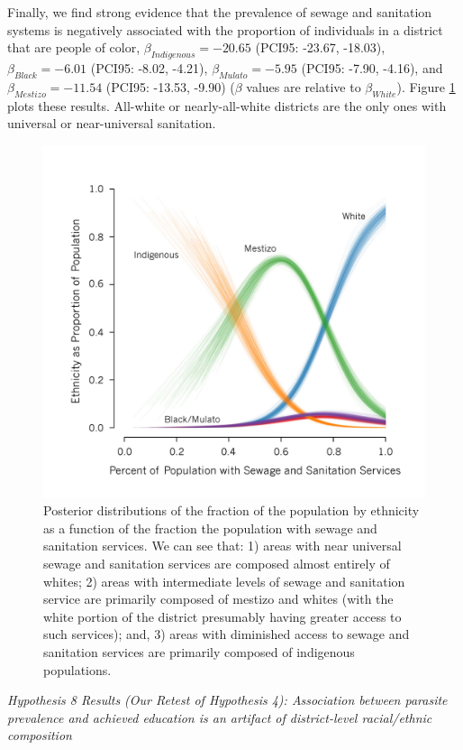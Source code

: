 \documentclass[12pt]{article}
\begin{document}
Finally, we find strong evidence that the prevalence of sewage and sanitation systems is negatively associated with the proportion of individuals in a district that are people of color, $\beta_{Indigenous}=-20.65$ (PCI95: -23.67, -18.03), $\beta_{Black}=-6.01$ (PCI95: -8.02, -4.21), $\beta_{Mulato}=-5.95$ (PCI95: -7.90, -4.16), and $\beta_{Mestizo}=-11.54
$ (PCI95: -13.53,  -9.90) ($\beta$ values are relative to $\beta_{White}$). Figure \ref{resSewerEth} plots these results. All-white or nearly-all-white districts are the only ones with universal or near-universal sanitation.\\
 \begin{figure}
\caption{\label{resSewerEth} Posterior distributions of the fraction of the population by ethnicity as a function of the fraction the population with sewage and sanitation services. We can see that: 1) areas with near universal sewage and sanitation services are composed almost entirely of whites; 2) areas with intermediate levels of sewage and sanitation service are primarily composed of mestizo and whites (with the white portion of the district presumably having greater access to such services); and, 3) areas with diminished access to sewage and sanitation services are primarily composed of indigenous populations.}
\includegraphics[width=5in]{Figures/SewageAndEthnicityModel} 
\end{figure}

\noindent\textit{Hypothesis 8 Results (Our Retest of Hypothesis 4):  Association between parasite prevalence and achieved education is an artifact of district-level racial/ethnic composition}
	
\end{document}
